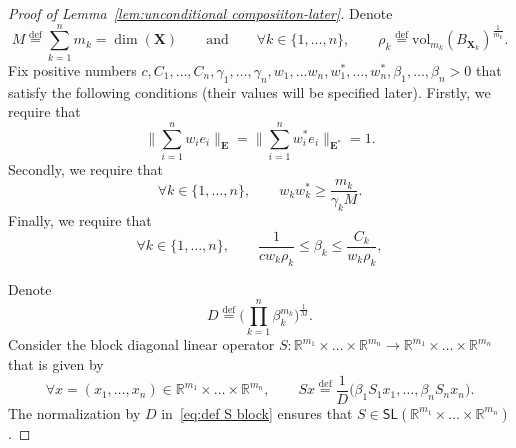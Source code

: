 \documentclass[11pt,reqno]{amsart}
\renewcommand{\le}{\leqslant}
\renewcommand{\ge}{\geqslant}
\newcommand{\n}{\{1,\ldots,n\}}
\newcommand{\X}{\mathbf X}
\newcommand{\R}{\mathbb R}
\theoremstyle{remark}
\newcommand{\SL}{\mathsf{SL}}
\newcommand{\eqdef}{\stackrel{\mathrm{def}}{=}}
\newcommand{\vol}{\mathrm{vol}}
\renewcommand{\1}{\mathbf 1}
\newcommand{\bfE}{\mathbf{E}}
\begin{document}
\begin{proof}[Proof of Lemma~\ref{lem:unconditional composiiton-later}]   Denote
\begin{equation}\label{eq:def Mrho}
M\eqdef \sum_{k=1}^n m_k=\dim(\X)\qquad\mathrm{and}\qquad \forall k\in \n,\qquad \rho_k\eqdef \vol_{m_k}(B_{\X_k})^{\frac{1}{m_k}}.
\end{equation}
Fix positive numbers $c,C_1,\ldots,C_n, \gamma_1,\ldots,\gamma_n,w_1,\ldots w_n,w_1^*,\ldots,w_n^*,\beta_1,\ldots,\beta_n>0$ that satisfy the following conditions (their values will be specified later). Firstly, we require that
\begin{equation}\label{eq:loza theta}
\Big\|\sum_{i=1}^n w_i e_i\Big\|_\bfE=\Big\|\sum_{i=1}^n w^*_i e_i\Big\|_{\bfE^{\textbf{*}}}=1.
\end{equation}
Secondly, we require that
\begin{equation}\label{eq:ww* lower}
\forall k\in \n,\qquad w_kw_k^*\ge \frac{m_k}{\gamma_k M}.
\end{equation}
Finally, we require that
\begin{equation}\label{eq:final choice of ak}
\forall k\in \n,\qquad \frac{1}{c w_k\rho_k}\le \beta_k\le \frac{C_k}{ w_k\rho_k} ,
\end{equation}

Denote
\begin{equation}\label{eq:def D determinant}
D\eqdef \bigg(\prod_{k=1}^n \beta_k^{{m_k}}\bigg)^{\frac{1}{M}}.
\end{equation}
Consider the block diagonal linear operator $S:\R^{m_1}\times\ldots\times \R^{m_n}\to \R^{m_1}\times\ldots\times \R^{m_n}$ that is given by
\begin{equation}\label{eq:def S block}
\forall x=(x_1,\ldots,x_n)\in \R^{m_1}\times\ldots\times \R^{m_n},\qquad Sx\eqdef \frac{1}{D}\big(\beta_1S_1x_1,\ldots,\beta_nS_nx_n\big).
\end{equation}
The normalization by $D$ in~\eqref{eq:def S block} ensures that $S\in \SL(\R^{m_1}\times\ldots\times \R^{m_n})$.


\end{proof}
\end{document}
